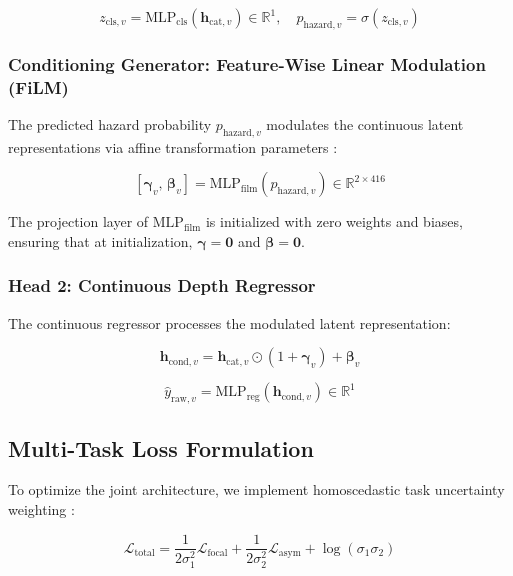 \documentclass[conference]{IEEEtran}
\begin{document}
\begin{equation}
z_{\text{cls}, v} = \text{MLP}_{\text{cls}}(\mathbf{h}_{\text{cat}, v}) \in \mathbb{R}^1, \quad p_{\text{hazard}, v} = \sigma(z_{\text{cls}, v})
\end{equation}

\subsubsection{Conditioning Generator: Feature-Wise Linear Modulation (FiLM)}
The predicted hazard probability $p_{\text{hazard}, v}$ modulates the continuous latent representations via affine transformation parameters \cite{perez2018}:

\begin{equation}
\left[ \boldsymbol{\gamma}_v, \, \boldsymbol{\beta}_v \right] = \text{MLP}_{\text{film}}(p_{\text{hazard}, v}) \in \mathbb{R}^{2 \times 416}
\end{equation}

The projection layer of $\text{MLP}_{\text{film}}$ is initialized with zero weights and biases, ensuring that at initialization, $\boldsymbol{\gamma} = \mathbf{0}$ and $\boldsymbol{\beta} = \mathbf{0}$.

\subsubsection{Head 2: Continuous Depth Regressor}
The continuous regressor processes the modulated latent representation:

\begin{equation}
\mathbf{h}_{\text{cond}, v} = \mathbf{h}_{\text{cat}, v} \odot (1 + \boldsymbol{\gamma}_v) + \boldsymbol{\beta}_v
\end{equation}

\begin{equation}
\hat{y}_{\text{raw}, v} = \text{MLP}_{\text{reg}}(\mathbf{h}_{\text{cond}, v}) \in \mathbb{R}^1
\end{equation}

\subsection{Multi-Task Loss Formulation}
To optimize the joint architecture, we implement homoscedastic task uncertainty weighting \cite{kendall2018}:

\begin{equation}
\mathcal{L}_{\text{total}} = \frac{1}{2\sigma_1^2} \mathcal{L}_{\text{focal}} + \frac{1}{2\sigma_2^2} \mathcal{L}_{\text{asym}} + \log(\sigma_1 \sigma_2)
\end{equation}
\end{document}
